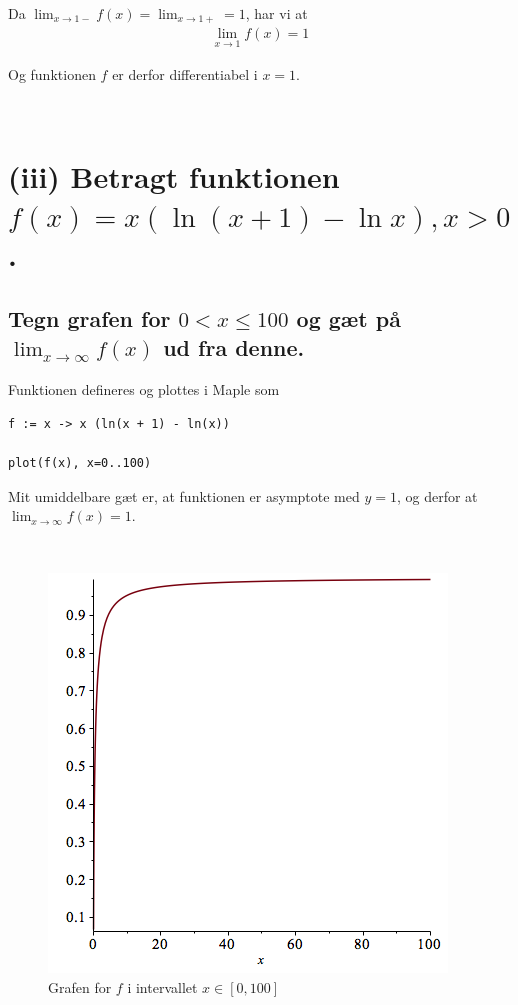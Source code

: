 \documentclass[11pt,a4paper]{article}
\newcommand{\limit}[2]{\lim_{#1 \rightarrow #2}}
\begin{document}
\begin{multicols}{2}
    Da $\limit{x}{1-} f(x) = \limit{x}{1+} = 1$, har vi at
    \begin{align}
        \limit{x}{1} f(x) = 1
    \end{align}

    Og funktionen $f$ er derfor differentiabel i $x = 1$.

    \vfill{\ }

\end{multicols}


\section
{
    (iii) \mdseries
    Betragt funktionen $f(x) = x(\ln(x + 1) - \ln x), x > 0$.
}

\subsection
{
    \mdseries
    Tegn grafen for $0 < x \leq 100$ og gæt på $\limit{x}{\infty} f(x)$ ud
    fra denne.
}
\begin{multicols}{2}
    Funktionen defineres og plottes i Maple som
\begin{lstlisting}
f := x -> x (ln(x + 1) - ln(x))

plot(f(x), x=0..100)
\end{lstlisting}
    
    Mit umiddelbare gæt er, at funktionen er asymptote med $y = 1$, og derfor
    at $\limit{x}{\infty} f(x) = 1$.

    \vfill{\ }\columnbreak

    \begin{figure}[H]
        \includegraphics[scale=0.5]{figures/3-3(iii)a-1.png}
        \caption{Grafen for $f$ i intervallet $x \in [0,100]$}
        \label{fig:3.3(iii)a-1}
    \end{figure}

\end{multicols}
\end{document}
